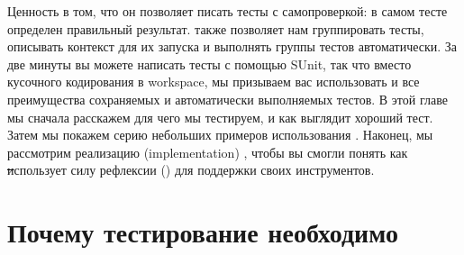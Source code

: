 \documentclass[a4paper,10pt,twoside]{book}
\begin{document}
Ценность \sunit в том, что он позволяет писать тесты с самопроверкой:
в самом тесте определен правильный результат.
\sunit также позволяет нам группировать тесты, описывать контекст для их запуска
и выполнять группы тестов автоматически.
За две минуты вы можете написать тесты с помощью SUnit,
так что вместо кусочного кодирования в workspace,
мы призываем вас использовать \sunit и все преимущества сохраняемых и автоматически выполняемых тестов.
В этой главе мы сначала расскажем для чего мы тестируем, и как выглядит хороший тест.
Затем мы покажем серию небольших примеров использования \sunit.
Наконец, мы рассмотрим реализацию (implementation) \sunit,
чтобы вы смогли понять как \st использует силу рефлексии () для поддержки своих инструментов.

\section{Почему тестирование необходимо}
\end{document}
